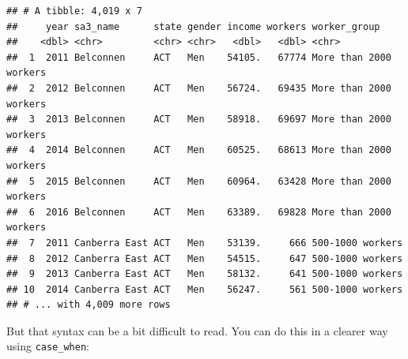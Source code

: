 \documentclass[]{book}
\newenvironment{Shaded}{\begin{snugshade}}{\end{snugshade}}
\newcommand{\DataTypeTok}[1]{\textcolor[rgb]{0.13,0.29,0.53}{#1}}
\newcommand{\DecValTok}[1]{\textcolor[rgb]{0.00,0.00,0.81}{#1}}
\newcommand{\KeywordTok}[1]{\textcolor[rgb]{0.13,0.29,0.53}{\textbf{#1}}}
\newcommand{\NormalTok}[1]{#1}
\newcommand{\OperatorTok}[1]{\textcolor[rgb]{0.81,0.36,0.00}{\textbf{#1}}}
\newcommand{\StringTok}[1]{\textcolor[rgb]{0.31,0.60,0.02}{#1}}
\begin{document}
\begin{Shaded}
\end{Shaded}

\begin{verbatim}
## # A tibble: 4,019 x 7
##     year sa3_name      state gender income workers worker_group          
##    <dbl> <chr>         <chr> <chr>   <dbl>   <dbl> <chr>                 
##  1  2011 Belconnen     ACT   Men    54105.   67774 More than 2000 workers
##  2  2012 Belconnen     ACT   Men    56724.   69435 More than 2000 workers
##  3  2013 Belconnen     ACT   Men    58918.   69697 More than 2000 workers
##  4  2014 Belconnen     ACT   Men    60525.   68613 More than 2000 workers
##  5  2015 Belconnen     ACT   Men    60964.   63428 More than 2000 workers
##  6  2016 Belconnen     ACT   Men    63389.   69828 More than 2000 workers
##  7  2011 Canberra East ACT   Men    53139.     666 500-1000 workers      
##  8  2012 Canberra East ACT   Men    54515.     647 500-1000 workers      
##  9  2013 Canberra East ACT   Men    58132.     641 500-1000 workers      
## 10  2014 Canberra East ACT   Men    56247.     561 500-1000 workers      
## # ... with 4,009 more rows
\end{verbatim}

But that syntax can be a bit difficult to read. You can do this in a clearer way using \texttt{case\_when}:

\begin{Shaded}
\end{Shaded}
\end{document}
